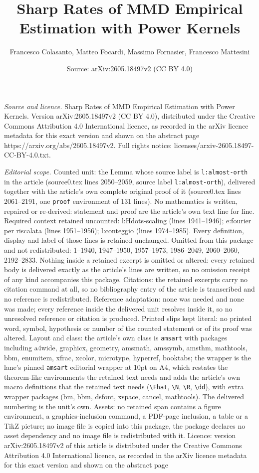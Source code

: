 \documentclass[10pt,a4paper]{amsart}
\title[Sharp Rates of MMD Empirical Estimation with Power Kernels]{Sharp Rates of MMD Empirical Estimation with Power Kernels}
\author{Francesco Colasanto, Matteo Focardi, Massimo Fornasier, Francesco Mattesini}
\date{Source: arXiv:2605.18497v2 (CC BY 4.0)}
\begin{document}
\maketitle

\noindent\emph{Source and licence.} Sharp Rates of MMD Empirical Estimation with Power Kernels. Version arXiv:2605.18497v2 (CC BY 4.0), distributed under the Creative Commons Attribution 4.0 International licence, as recorded in the arXiv licence metadata for this exact version and shown on the abstract page https://arxiv.org/abs/2605.18497v2. Full rights notice: licenses/arxiv-2605.18497-CC-BY-4.0.txt.\par\smallskip

\noindent\textit{Editorial scope.} Counted unit: the Lemma whose source label is \texttt{l:almost-orth} in the article (source0.tex lines 2050--2059, source label \texttt{l:almost-orth}), delivered together with the article's own complete original proof of it (source0.tex lines 2061--2191, one \texttt{proof} environment of 131 lines). No mathematics is written, repaired or re-derived: statement and proof are the article's own text line for line. Required context retained uncounted: l:Hdots-scaling (lines 1941--1946); e:fourier per riscalata (lines 1951--1956); l:conteggio (lines 1974--1985). Every definition, display and label of those lines is retained unchanged. Omitted from this package and not redistributed: 1--1940, 1947--1950, 1957--1973, 1986--2049, 2060--2060, 2192--2833. Nothing inside a retained excerpt is omitted or altered: every retained body is delivered exactly as the article's lines are written, so no omission receipt of any kind accompanies this package. Citations: the retained excerpts carry no citation command at all, so no bibliography entry of the article is transcribed and no reference is redistributed. Reference adaptation: none was needed and none was made; every reference inside the delivered unit resolves inside it, so no unresolved reference or citation is produced. Printed slips kept literal: no printed word, symbol, hypothesis or number of the counted statement or of its proof was altered. Layout and class: the article's own class is \texttt{amsart} with packages including a4wide, graphicx, geometry, amsmath, amssymb, amsthm, mathtools, bbm, enumitem, xfrac, xcolor, microtype, hyperref, booktabs; the wrapper is the lane's pinned \texttt{amsart} editorial wrapper at 10pt on A4, which restates the theorem-like environments the retained text needs and adds the article's own macro definitions that the retained text needs (\texttt{\textbackslash Fhat}, \texttt{\textbackslash N}, \texttt{\textbackslash R}, \texttt{\textbackslash dd}), with extra wrapper packages (bm, bbm, dsfont, xspace, cancel, mathtools). The delivered numbering is the unit's own. Assets: no retained span contains a figure environment, a graphics-inclusion command, a PDF-page inclusion, a table or a TikZ picture; no image file is copied into this package, the package declares no asset dependency and no image file is redistributed with it. Licence: version arXiv:2605.18497v2 of this article is distributed under the Creative Commons Attribution 4.0 International licence, as recorded in the arXiv licence metadata for this exact version and shown on the abstract page 
\end{document}

